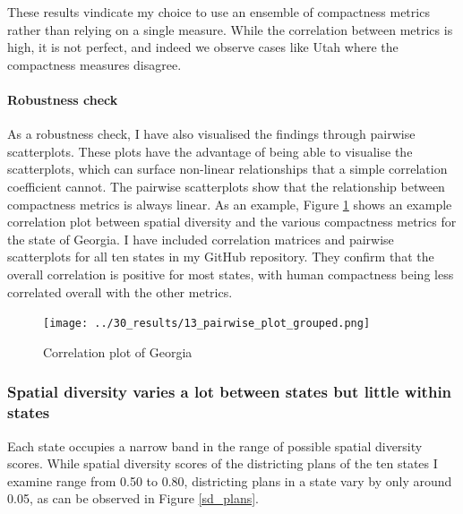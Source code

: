 \documentclass[]{article}
\let\oldparagraph\paragraph
\renewcommand{\paragraph}[1]{\oldparagraph{#1}\mbox{}}
\begin{document}
These results vindicate my choice to use an ensemble of compactness
metrics rather than relying on a single measure. While the correlation
between metrics is high, it is not perfect, and indeed we observe cases
like Utah where the compactness measures disagree.

\hypertarget{robustness-check}{%
\paragraph{Robustness check}\label{robustness-check}}

As a robustness check, I have also visualised the findings through
pairwise scatterplots. These plots have the advantage of being able to
visualise the scatterplots, which can surface non-linear relationships
that a simple correlation coefficient cannot. The pairwise scatterplots
show that the relationship between compactness metrics is always linear.
As an example, Figure \ref{pairwise_plot_grouped} shows an example
correlation plot between spatial diversity and the various compactness
metrics for the state of Georgia. I have included correlation matrices
and pairwise scatterplots for all ten states in my GitHub repository.
They confirm that the overall correlation is positive for most states,
with human compactness being less correlated overall with the other
metrics.

\begin{figure}
\centering
\texttt{[image: ../30\_results/13\_pairwise\_plot\_grouped.png]}
\caption{Correlation plot of Georgia\label{pairwise_plot_grouped}}
\end{figure}

\hypertarget{spatial-diversity-varies-a-lot-between-states-but-little-within-states}{%
\subsubsection{Spatial diversity varies a lot between states but little
within
states}\label{spatial-diversity-varies-a-lot-between-states-but-little-within-states}}

Each state occupies a narrow band in the range of possible spatial
diversity scores. While spatial diversity scores of the districting
plans of the ten states I examine range from 0.50 to 0.80, districting
plans in a state vary by only around 0.05, as can be observed in Figure
\ref{sd_plans}.
\end{document}
